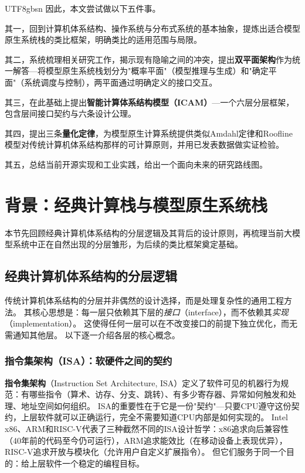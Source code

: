 \documentclass[11pt,a4paper]{article}
\begin{document}
\begin{CJK*}{UTF8}{gbsn}
因此，本文尝试做以下五件事。

其一，回到计算机体系结构、操作系统与分布式系统的基本抽象，提炼出适合模型原生系统栈的类比框架，明确类比的适用范围与局限。

其二，系统梳理相关研究工作，揭示现有隐喻之间的冲突，提出\textbf{双平面架构}作为统一解答---将模型原生系统栈划分为"概率平面"（模型推理与生成）和"确定平面"（系统调度与控制），两平面通过明确定义的接口交互。

其三，在此基础上提出\textbf{智能计算体系结构模型（ICAM）}---一个六层分层框架，包含层间接口契约与六条设计公理。

其四，提出三条\textbf{量化定律}，为模型原生计算系统提供类似Amdahl定律和Roofline模型对传统计算机体系结构那样的可计算原则，并用已发表数据做实证检验。

其五，总结当前开源实现和工业实践，给出一个面向未来的研究路线图。

\section{背景：经典计算栈与模型原生系统栈}
\label{sec:background}

本节先回顾经典计算机体系结构的分层逻辑及其背后的设计原则，再梳理当前大模型系统中正在自然出现的分层雏形，为后续的类比框架奠定基础。

\subsection{经典计算机体系结构的分层逻辑}

传统计算机体系结构的分层并非偶然的设计选择，而是处理复杂性的通用工程方法\cite{hennessy2017quantitative}。
其核心思想是：每一层只依赖其下层的\emph{接口}（interface），而不依赖其\emph{实现}（implementation）。
这使得任何一层可以在不改变接口的前提下独立优化，而无需通知其他层。
以下逐一介绍各层的核心概念。

\subsubsection{指令集架构（ISA）：软硬件之间的契约}

\textbf{指令集架构}（Instruction Set Architecture, ISA）定义了软件可见的机器行为规范：有哪些指令（算术、访存、分支、跳转）、有多少寄存器、异常如何触发和处理、地址空间如何组织。
ISA的重要性在于它是一份"契约"---只要CPU遵守这份契约，上层软件就可以正确运行，完全不需要知道CPU内部是如何实现的。
Intel x86、ARM和RISC-V代表了三种截然不同的ISA设计哲学\cite{intel_sdm_2026,riscv_spec_2026}：x86追求向后兼容性（40年前的代码至今仍可运行），ARM追求能效比（在移动设备上表现优异），RISC-V追求开放与模块化（允许用户自定义扩展指令）。
但它们服务于同一个目的：给上层软件一个稳定的编程目标。


\end{CJK*}
\end{document}
